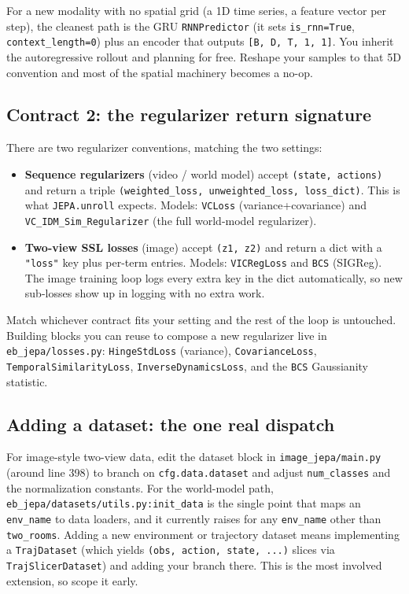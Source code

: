 \documentclass{article}
\newcommand{\code}[1]{\texttt{\small #1}}
\newcommand{\file}[1]{\texttt{\small #1}}
\begin{document}
\begin{tipbox}
For a new modality with no spatial grid (a 1D time series, a feature vector per
step), the cleanest path is the GRU \code{RNNPredictor} (it sets
\code{is\_rnn=True}, \code{context\_length=0}) plus an encoder that outputs
\code{[B, D, T, 1, 1]}. You inherit the autoregressive rollout and planning for
free. Reshape your samples to that 5D convention and most of the spatial machinery
becomes a no-op.
\end{tipbox}

\subsection{Contract 2: the regularizer return signature}

There are two regularizer conventions, matching the two settings:

\begin{itemize}[leftmargin=1.4em,itemsep=2pt,topsep=2pt]
  \item \textbf{Sequence regularizers} (video / world model) accept
    \code{(state, actions)} and return a triple
    \code{(weighted\_loss, unweighted\_loss, loss\_dict)}. This is what
    \code{JEPA.unroll} expects. Models: \code{VCLoss} (variance+covariance) and
    \code{VC\_IDM\_Sim\_Regularizer} (the full world-model regularizer).
  \item \textbf{Two-view SSL losses} (image) accept \code{(z1, z2)} and return a
    dict with a \code{"loss"} key plus per-term entries. Models: \code{VICRegLoss}
    and \code{BCS} (SIGReg). The image training loop logs every extra key in the
    dict automatically, so new sub-losses show up in logging with no extra work.
\end{itemize}

Match whichever contract fits your setting and the rest of the loop is untouched.
Building blocks you can reuse to compose a new regularizer live in
\file{eb\_jepa/losses.py}: \code{HingeStdLoss} (variance), \code{CovarianceLoss},
\code{TemporalSimilarityLoss}, \code{InverseDynamicsLoss}, and the \code{BCS}
Gaussianity statistic.

\subsection{Adding a dataset: the one real dispatch}

For image-style two-view data, edit the dataset block in
\file{image\_jepa/main.py} (around line 398) to branch on \code{cfg.data.dataset}
and adjust \code{num\_classes} and the normalization constants. For the
world-model path, \file{eb\_jepa/datasets/utils.py:init\_data} is the single point
that maps an \code{env\_name} to data loaders, and it currently raises for any
\code{env\_name} other than \code{two\_rooms}. Adding a new environment or
trajectory dataset means implementing a \code{TrajDataset} (which yields
\code{(obs, action, state, ...)} slices via \code{TrajSlicerDataset}) and adding
your branch there. This is the most involved extension, so scope it early.
\end{document}
